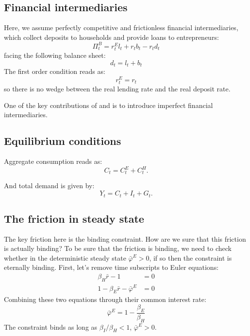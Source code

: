 \documentclass[a4paper,12pt]{article}%
\begin{document}
\subsection{Financial intermediaries}

Here, we assume perfectly competitive and frictionless financial
intermediaries, which collect deposits to households and provide loans to
entrepreneurs:%
\begin{equation}
\Pi_{t}^{B}=r_{t}^{E}l_{t}+r_{t}b_{t}-r_{t}d_{t}%
\end{equation}
facing the following balance sheet:%
\[
d_{t}=l_{t}+b_{t}%
\]
The first order condition reads as:%
\[
r_{t}^{E}=r_{t}%
\]
so there is no wedge between the real lending rate and the real deposit rate.

One of the key contributions of \cite{gerali2010credit} and
\cite{iacoviello2015financial} is to introduce imperfect financial intermediaries.

\subsection{Equilibrium conditions}

Aggregate consumption reads as:%
\begin{equation}
C_{t}=C_{t}^{E}+C_{t}^{H}.
\end{equation}


And total demand is given by:%
\begin{equation}
Y_{t}=C_{t}+I_{t}+G_{t}.
\end{equation}


\subsection{The friction in steady state}

The key friction here is the binding constraint. How are we sure that this
friction is actually binding? To be sure that the friction is binding, we need
to check whether in the deterministic steady state $\bar{\varphi}^{E}>0$, if
so then the constraint is eternally binding. First, let's remove time
subscripts to Euler equations:%
\begin{align*}
\beta_{H}\bar{r}-1  &  =0\\
1-\beta_{E}\bar{r}-\bar{\varphi}^{E}  &  =0
\end{align*}
Combining these two equations through their common interest rate:%
\[
\bar{\varphi}^{E}=1-\frac{\beta_{E}}{\beta_{H}}%
\]
The constraint binds as long as $\beta_{I}/\beta_{H}<1$, $\bar{\varphi}^{E}>0$.%

\footnotesize

%
\normalsize
\end{document}
